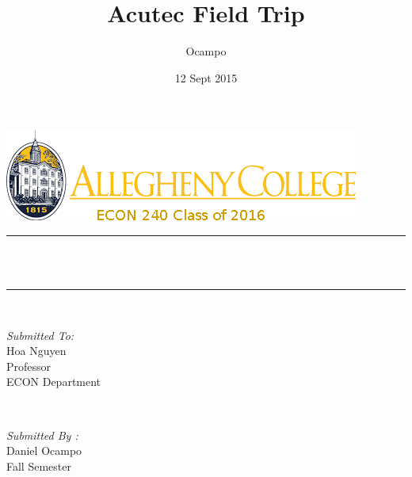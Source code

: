 \documentclass[12pt]{article}
\title{Acutec Field Trip}								%
\author{Ocampo}								%
\date{12 Sept 2015}											%
\makeatletter
\let\thetitle\@title
\makeatother
\begin{document}

\begin{titlepage}
	\centering
    \vspace*{0.5 cm}
    \includegraphics[scale = 0.75]{picture.png}\\[1.0 cm]	%
	\rule{\linewidth}{0.2 mm} \\[0.4 cm]
	{ \huge \bfseries \thetitle}\\
	\rule{\linewidth}{0.2 mm} \\[1.5 cm]
	
	\begin{minipage}{0.4\textwidth}
		\begin{flushleft} \large
			\emph{Submitted To:}\\
			Hoa Nguyen\\
             Professor\\
            ECON Department\\
			\end{flushleft}
			\end{minipage}~
			\begin{minipage}{0.4\textwidth}
            
			\begin{flushright} \large
			\emph{Submitted By :} \\
			Daniel Ocampo\\
 
            Fall Semester  \\
		\end{flushright}
		
	
        
	\end{minipage}\\[2 cm]
	
	
\end{titlepage}


\tableofcontents
\pagebreak

\end{document}
